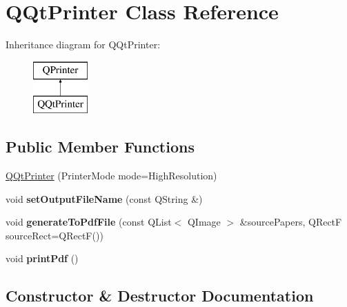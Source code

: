 \hypertarget{class_q_qt_printer}{}\section{Q\+Qt\+Printer Class Reference}
\label{class_q_qt_printer}
Inheritance diagram for Q\+Qt\+Printer\+:\begin{figure}[H]
\begin{center}
\leavevmode
\includegraphics[height=2.000000cm]{class_q_qt_printer}
\end{center}
\end{figure}
\subsection*{Public Member Functions}
\begin{DoxyCompactItemize}
\item 
\mbox{\hyperlink{class_q_qt_printer_ac39ab40bbb795ebaa3ed1186bb3004f2}{Q\+Qt\+Printer}} (Printer\+Mode mode=High\+Resolution)
\item 
\mbox{\label{class_q_qt_printer_a3291ff23395b96f508535e106faa1a5d}} 
void {\bfseries set\+Output\+File\+Name} (const Q\+String \&)
\item 
\mbox{\label{class_q_qt_printer_ad4f5580bb3cf5589175ce1ef9cdb2e8c}} 
void {\bfseries generate\+To\+Pdf\+File} (const Q\+List$<$ Q\+Image $>$ \&source\+Papers, Q\+RectF source\+Rect=Q\+RectF())
\item 
\mbox{\label{class_q_qt_printer_a07ee07a0f7c0a737ee45fb967e1b0b82}} 
void {\bfseries print\+Pdf} ()
\end{DoxyCompactItemize}


\subsection{Constructor \& Destructor Documentation}
\mbox{\label{class_q_qt_printer_ac39ab40bbb795ebaa3ed1186bb3004f2}} 
